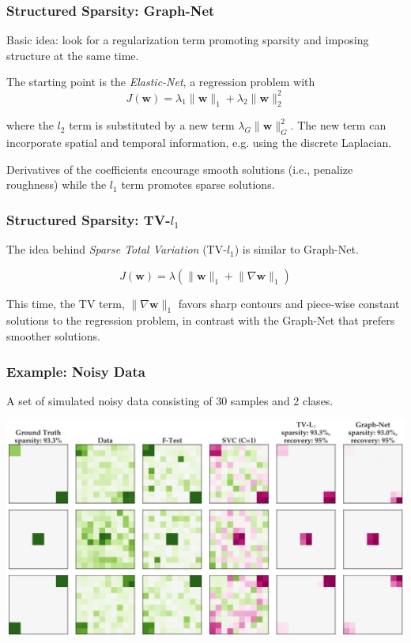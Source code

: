 \documentclass[11pt]{beamer}
\begin{document}
\begin{frame}[t,shrink]
  \frametitle{Structured Sparsity: Graph-Net}
  Basic idea: look for a regularization term promoting sparsity and imposing
  structure at the same time.

  The starting point is the \emph{Elastic-Net}, a regression problem with
  \[J(\mathbf{w}) = \lambda_{1}\lVert{\mathbf{w}}\rVert_{1} + 
    \lambda_{2}\lVert{\mathbf{w}}\rVert_{2}^{2}\]

  where the \(l_{2}\) term is substituted by a new term
  \(\lambda_{G}\lVert{\mathbf{w}}\rVert_{G}^{2}\). The new term can incorporate
  spatial and temporal information, e.g. using the discrete Laplacian.

  Derivatives of the coefficients encourage smooth solutions
  (i.e., penalize roughness) while the $l_{1}$ term promotes sparse solutions. 

\end{frame}
\begin{frame}
  \frametitle{Structured Sparsity: TV-$l_1$}
  The idea behind \emph{Sparse Total Variation} (TV-$l_{1}$) is similar to
  Graph-Net. 

  \[J(\mathbf{w}) = \lambda \left( \lVert{\mathbf{w}}\rVert _{1} + 
   \lVert{\nabla\mathbf{w}}\rVert _{1}\right) \]

  This time, the TV term, $\lVert{\nabla\mathbf{w}}\rVert _{1}$ favors sharp
  contours and piece-wise constant solutions to the regression problem, in contrast
  with the Graph-Net that prefers smoother solutions.
\end{frame}
\begin{frame}[t]
  \frametitle{Example: Noisy Data}
  A set of simulated noisy data consisting of 30 samples and 2 clases. 
  \begin{center}
    \includegraphics[scale=0.25]{figures/weights_synthetic_data_2.62_cbc.png} 
  \end{center}
\end{frame}
\end{document}
